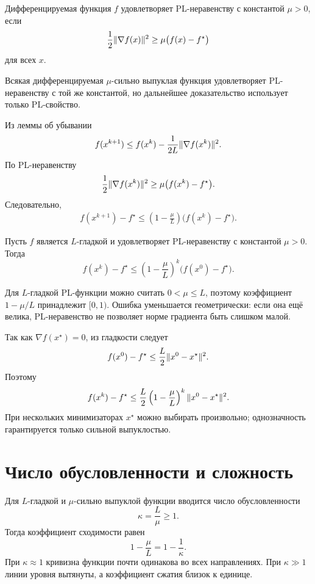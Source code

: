 \begin{definition}
Дифференцируемая функция \(f\) удовлетворяет PL-неравенству с
константой \(\mu>0\), если
\[
    \frac12\lVert\nabla f(x)\rVert^2
    \ge
    \mu\bigl(f(x)-f^\star\bigr)
\]
для всех \(x\).
\end{definition}

Всякая дифференцируемая \(\mu\)-сильно выпуклая функция
удовлетворяет PL-неравенству с той же константой, но дальнейшее
доказательство использует только PL-свойство.

Из леммы об убывании
\[
    f(x^{k+1})
    \le
    f(x^k)
    -
    \frac1{2L}\lVert\nabla f(x^k)\rVert^2.
\]
По PL-неравенству
\[
    \frac12\lVert\nabla f(x^k)\rVert^2
    \ge
    \mu\bigl(f(x^k)-f^\star\bigr).
\]
Следовательно,
\[
\begin{aligned}
    f(x^{k+1})-f^\star
    \le
    \left(1-\frac\mu L\right)
    \bigl(f(x^k)-f^\star\bigr).
\end{aligned}
\]

\begin{theorem}
Пусть \(f\) является \(L\)-гладкой и удовлетворяет
PL-неравенству с константой \(\mu>0\). Тогда
\[
    f(x^k)-f^\star
    \le
    \left(1-\frac\mu L\right)^k
    \bigl(f(x^0)-f^\star\bigr).
\]
\end{theorem}

Для \(L\)-гладкой PL-функции можно считать \(0<\mu\le L\), поэтому
коэффициент \(1-\mu/L\) принадлежит \([0,1)\). Ошибка уменьшается
геометрически: если она ещё велика, PL-неравенство не позволяет норме
градиента быть слишком малой.

Так как \(\nabla f(x^\star)=0\), из гладкости следует
\[
    f(x^0)-f^\star
    \le
    \frac L2\lVert x^0-x^\star\rVert^2.
\]
Поэтому
\[
    f(x^k)-f^\star
    \le
    \frac L2
    \left(1-\frac\mu L\right)^k
    \lVert x^0-x^\star\rVert^2.
\]
При нескольких минимизаторах \(x^\star\) можно выбирать произвольно;
однозначность гарантируется только сильной выпуклостью.

\section{Число обусловленности и сложность}

Для \(L\)-гладкой и \(\mu\)-сильно выпуклой функции вводится число
обусловленности
\[
    \kappa=\frac L\mu\ge1.
\]
Тогда коэффициент сходимости равен
\[
    1-\frac\mu L=1-\frac1\kappa.
\]
При \(\kappa\approx1\) кривизна функции почти одинакова во всех
направлениях. При \(\kappa\gg1\) линии уровня вытянуты, а коэффициент
сжатия близок к единице.

